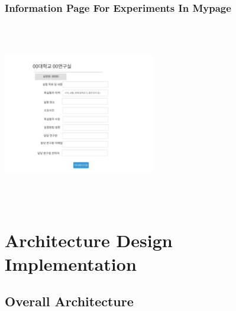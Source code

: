 \documentclass[letterpaper, 10 pt, conference]{ieeeconf}  %
\begin{document}
\subsubsection{Information Page For Experiments In Mypage}
\includegraphics[width=0.5\textwidth,height = 8cm]{Oven_ver2/20_detailedInformationInMypage.jpg}




\section{Architecture Design Implementation }

\subsection{Overall Architecture}
\end{document}
